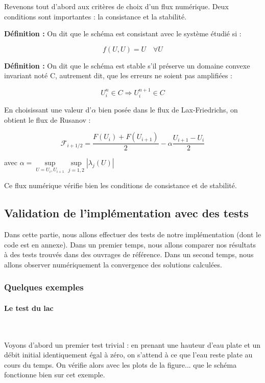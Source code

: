 \documentclass[
11pt, %
francais, %
singlespacing, %
headsepline, %
]{MastersDoctoralThesis} %
\theoremstyle{definition}
\begin{document}
Revenons tout d'abord aux critères de choix d'un flux numérique. Deux conditions sont importantes : la consistance et la stabilité.

\textbf{Définition :} On dit que le schéma est consistant avec le système étudié si :

$$ f(U,U) = U \quad \forall U $$ 

\textbf{Définition :} On dit que le schéma est stable s'il préserve un domaine convexe invariant noté C, autrement dit, que les erreurs ne soient pas amplifiées :

$$ U_i ^n \in C \Rightarrow U_i ^{n+1} \in C  $$

En choisissant une valeur d'$\alpha$ bien posée dans le flux de Lax-Friedrichs, on obtient le flux de Rusanov :

$$ \mathcal{F}_{i+1/2} = \frac{F(U_i) + F(U_{i+1})}{2} - \alpha \frac{U_{i+1} - U_i}{2} $$

avec $ \alpha = \underset{U = U_i , U_{i+1}}{\sup} \underset{j = 1 , 2}{\sup} | \lambda_j(U) | $

Ce flux numérique vérifie bien les conditions de consistance et de stabilité.


\subsection{Validation de l'implémentation avec des tests}

Dans cette partie, nous allons effectuer des tests de notre implémentation (dont le code est en annexe).
Dans un premier temps, nous allons comparer nos résultats à des tests trouvés dans des ouvrages de référence.
Dans un second temps, nous allons observer numériquement la convergence des solutions calculées.

\subsubsection{Quelques exemples}

\paragraph{Le test du lac} \

Voyons d'abord un premier test trivial : en prenant une hauteur d'eau plate et un débit initial identiquement égal à zéro, on s'attend à ce que l'eau reste plate au cours du temps.
On vérifie 	alors avec les plots de la figure... que le schéma fonctionne bien sur cet exemple.
\end{document}
